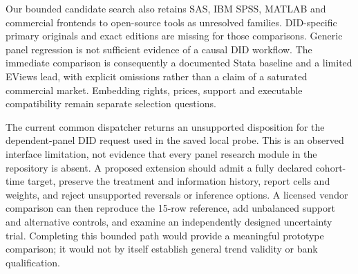 Our bounded candidate search also retains SAS, IBM SPSS, MATLAB and
commercial frontends to open-source tools as unresolved families.
DID-specific primary originals and exact editions are missing for those
comparisons. Generic panel regression is not sufficient evidence of a
causal DID workflow. The immediate comparison is consequently a documented
Stata baseline and a limited EViews lead, with explicit omissions rather
than a claim of a saturated commercial market. Embedding rights, prices,
support and executable compatibility remain separate selection questions.

The current common dispatcher returns an unsupported disposition for the
dependent-panel DID request used in the saved local probe. This is an
observed interface limitation, not evidence that every panel research
module in the repository is absent. A proposed extension should admit a
fully declared cohort-time target, preserve the treatment and information
history, report cells and weights, and reject unsupported reversals or
inference options. A licensed vendor comparison can then reproduce the
15-row reference, add unbalanced support and alternative controls, and
examine an independently designed uncertainty trial. Completing this
bounded path would provide a meaningful prototype comparison; it would
not by itself establish general trend validity or bank qualification.
\citep{exec18_gp_dispatch,exec18_gp_panel_reference}
